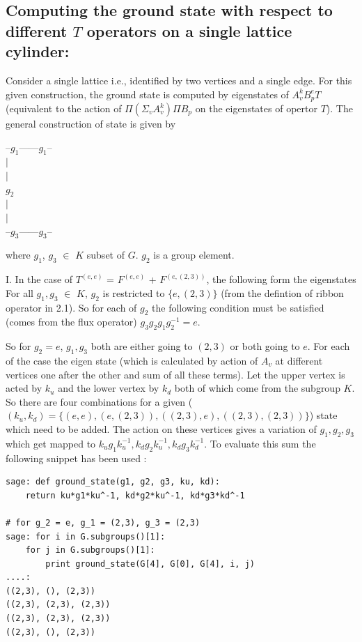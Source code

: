 \subsection{Computing the ground state with respect to different $T$ operators on a single lattice cylinder:}
    
     Consider a single lattice i.e., identified by two vertices and a single edge. For this given construction, the ground state is computed by 
eigenstates of $A_{v}^{k}B_{p}^{e}T$ (equivalent to the action of $\Pi(\Sigma_{v}A_{v}^{k}) \Pi B_{p}$ on the eigenstates of opertor $T$). The general construction of state is given by 

\begin{center}
  
--$g_{1}$------$g_{1}$--\\
	   $|$\\
	   $|$\\
	 $g_{2}$\\
	   $|$\\
	   $|$	\\
--$g_{3}$------$g_{3}$--\\
\end{center}
where $g_{1}$, $g_{3}$ $\in$ $K$ subset of $G$. $g_{2}$ is a group element.


I. In the case of $T^{(e,e)}$ = $F^{(e,e)}$ + $F^{(e,(2,3))}$, the following form the eigenstates \\
For all  $g_{1}, g_{3}$ $\in$ $K$, $g_{2}$ is restricted to  $\{e, (2,3)\}$ (from the defintion of ribbon operator in 2.1).
So for each of $g_{2}$ the following condition must be satisfied (comes from the flux operator) $g_{3}g_{2}g_{1}g_{2}^{-1} =  e$.

So for $g_{2} =  e$, $g_{1}, g_{3}$ both are either going to  $(2,3)$ or both going to $e$. For each of the case the eigen state
(which is calculated by action of $A_{v}$ at different vertices one after the other and sum of all these terms). Let the upper vertex 
is acted by $k_{u}$ and the lower vertex by $k_{d}$ both of which come from the subgroup $K$. So there are four combinations for a given
($(k_{u}, k_{d}) = \{(e,e), (e, (2,3)), ((2,3),e), ((2,3), (2,3))\}$)  state which need to be added. The action on these vertices gives 
a variation of $g_{1}, g_{2}, g_{3}$ which get mapped to  $k_{u}g_{1}k_{u}^{-1}, k_{d}g_{2}k_{u}^{-1}, k_{d}g_{3}k_{d}^{-1}$. 
To evaluate this sum the following snippet has been used :

\begin{lstlisting}[frame=single]
sage: def ground_state(g1, g2, g3, ku, kd):
    return ku*g1*ku^-1, kd*g2*ku^-1, kd*g3*kd^-1

# for g_2 = e, g_1 = (2,3), g_3 = (2,3) 
sage: for i in G.subgroups()[1]:
    for j in G.subgroups()[1]:
        print ground_state(G[4], G[0], G[4], i, j)
....: 
((2,3), (), (2,3))
((2,3), (2,3), (2,3))
((2,3), (2,3), (2,3))
((2,3), (), (2,3))
\end{lstlisting}

